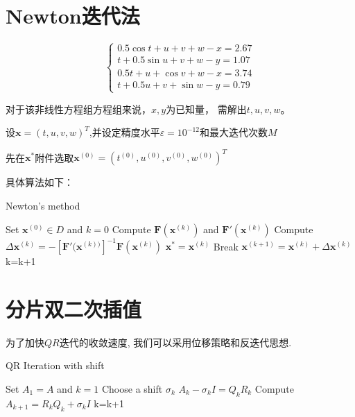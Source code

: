 \section{Newton迭代法}

\[\left\{ \begin{array}{l}
0.5\cos t + u + v + w - x = 2.67\\
t + 0.5\sin u + v + w - y = 1.07\\
0.5t + u + \cos v + w - x = 3.74\\
t + 0.5u + v + \sin w - y = 0.79
\end{array} \right.\]

对于该非线性方程组方程组来说，$x,y$为已知量，
需解出$t,u,v,w$。

设$\bm{x}= {(t,u,v,w)^T}$,并设定精度水平${\varepsilon } = {10^{ - 12}}$和最大迭代次数$M$

先在${\bm{x}^{\ast}}$附件选取${\bm{x}^{(0)}}= {({t^{(0)}},{u^{(0)}},{v^{(0)}},{w^{(0)}})^T}$

具体算法如下：
\begin{algorithm}[h]  
\caption{Newton's method}  
\begin{algorithmic}[1]  
\STATE Set $\bm{x}^{(0)}\in D$ and $k=0$
\STATE Compute $\bm{F}(\bm{x}^{(k)})$ 
and $\bm{F}'(\bm{x}^{(k)})$
\STATE Compute $\Delta \bm{x}^{(k)}=-[\bm{F}'(\bm{x}^{(k))}]^{-1}\bm{F}(\bm{x}^{(k)})$
\STATE $\bm{x}^{\ast}=\bm{x}^{(k)}$
\STATE Break
\ENDIF 
\STATE $\bm{x}^{(k+1)}= \bm{x}^{(k)}+
\Delta \bm{x}^{(k)}$
\STATE k=k+1
\ENDWHILE
\end{algorithmic}  
\end{algorithm}  




\section{分片双二次插值}




为了加快$QR$迭代的收敛速度, 我们可以采用位移策略和反迭代思想.
\begin{algorithm}[h]  
\caption{QR Iteration with shift}  
\begin{algorithmic}[1]  
\STATE Set $A_1=A$ and $k=1$
\STATE Choose a shift $\sigma_k$
\STATE ${A_{k}-\sigma_kI} = Q_k R_k$
\STATE Compute $A_{k+1}=R_k Q_k+\sigma_kI$
\STATE k=k+1
\ENDWHILE
\end{algorithmic}  
\end{algorithm}  

